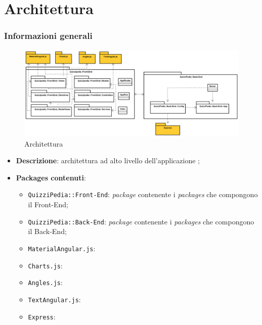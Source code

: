 \newpage

\section{Architettura}

\subsubsection{Informazioni generali}
\label{Architettura}
\begin{figure}[ht]
	\centering
	\includegraphics[scale=0.35]{UML/Package/QuizziPedia.png}
	\caption{Architettura}
\end{figure}
\FloatBarrier
\begin{itemize}
	\item \textbf{Descrizione}: architettura ad alto livello dell'applicazione \progetto;
	\item \textbf{Packages contenuti}:
	\begin{itemize}
		\item \texttt{QuizziPedia::Front-End}: \textit{package} contenente i \textit{packages} che compongono il Front-End;
		\item \texttt{QuizziPedia::Back-End}: \textit{package} contenente i \textit{packages} che compongono il Back-End;
		\item \texttt{MaterialAngular.js}:
		\item \texttt{Charts.js}:
		\item \texttt{Angles.js}:
		\item \texttt{TextAngular.js}:
		\item \texttt{Express}:
	\end{itemize}
\end{itemize}
